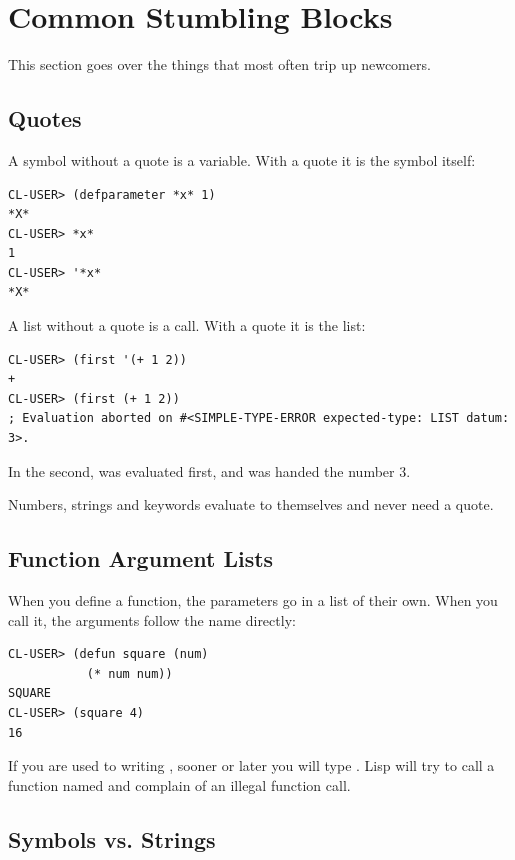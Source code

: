 \section{Common Stumbling Blocks}

This section goes over the things that most often trip up newcomers.

\subsection{Quotes}

A symbol without a quote is a variable. With a quote it is the symbol
itself:

\begin{verbatim}
CL-USER> (defparameter *x* 1)
*X*
CL-USER> *x*
1
CL-USER> '*x*
*X*
\end{verbatim}

A list without a quote is a call. With a quote it is the list:

\begin{verbatim}
CL-USER> (first '(+ 1 2))
+
CL-USER> (first (+ 1 2))
; Evaluation aborted on #<SIMPLE-TYPE-ERROR expected-type: LIST datum: 3>.
\end{verbatim}

In the second,  was evaluated first, and 
was handed the number 3.

Numbers, strings and keywords evaluate to themselves and never need a
quote.

\subsection{Function Argument Lists}

When you define a function, the parameters go in a list of their own.
When you call it, the arguments follow the name directly:

\begin{verbatim}
CL-USER> (defun square (num)
           (* num num))
SQUARE
CL-USER> (square 4)
16
\end{verbatim}

If you are used to writing , sooner or later you will
type . Lisp will try to call a function named
 and complain of an illegal function call.

\subsection{Symbols vs. Strings}

